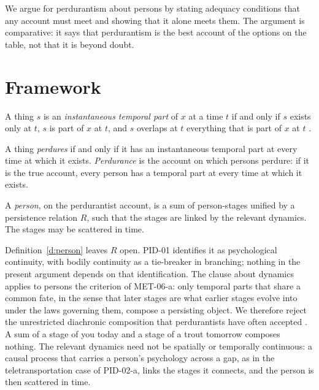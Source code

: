 \documentclass{situationist-preprint}
\begin{document}
We argue for perdurantism about persons by stating adequacy conditions that any account must meet and showing that it alone meets them. The argument is comparative: it says that perdurantism is the best account of the options on the table, not that it is beyond doubt.

\section{Framework}\label{s:frame}

\begin{definition}\label{d:tp}
A thing $s$ is an \emph{instantaneous temporal part} of $x$ at a time $t$ if and only if $s$ exists only at $t$, $s$ is part of $x$ at $t$, and $s$ overlaps at $t$ everything that is part of $x$ at $t$ \citep{Sider2001}.
\end{definition}

\begin{definition}\label{d:perd}
A thing \emph{perdures} if and only if it has an instantaneous temporal part at every time at which it exists. \emph{Perdurance} is the account on which persons perdure: if it is the true account, every person has a temporal part at every time at which it exists.
\end{definition}

\begin{definition}\label{d:person}
A \emph{person}, on the perdurantist account, is a sum of person-stages unified by a persistence relation $R$, such that the stages are linked by the relevant dynamics. The stages may be scattered in time.
\end{definition}

Definition~\ref{d:person} leaves $R$ open. PID-01 identifies it as psychological continuity, with bodily continuity as a tie-breaker in branching; nothing in the present argument depends on that identification. The clause about dynamics applies to persons the criterion of MET-06-a: only temporal parts that share a common fate, in the sense that later stages are what earlier stages evolve into under the laws governing them, compose a persisting object. We therefore reject the unrestricted diachronic composition that perdurantists have often accepted \citep{Sider2001}. A sum of a stage of you today and a stage of a trout tomorrow composes nothing. The relevant dynamics need not be spatially or temporally continuous: a causal process that carries a person's psychology across a gap, as in the teletransportation case of PID-02-a, links the stages it connects, and the person is then scattered in time.
\end{document}
